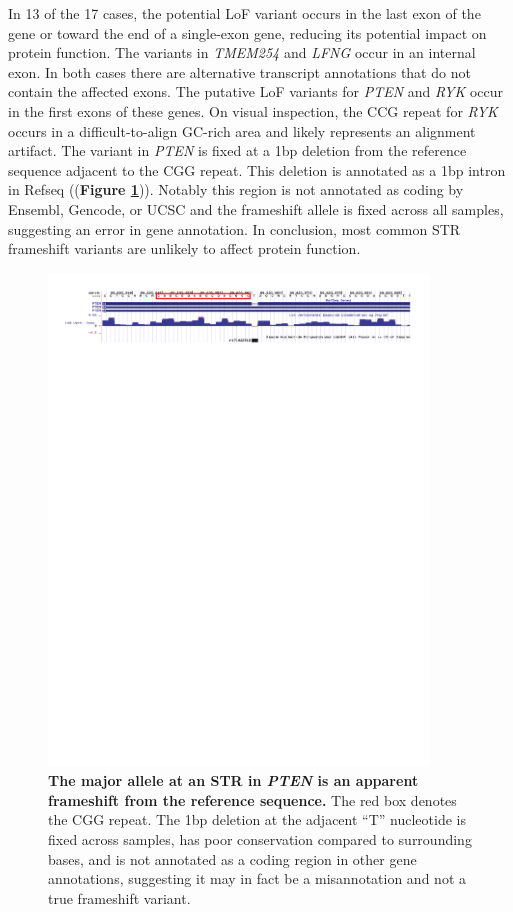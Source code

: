 In 13 of the 17 cases, the potential LoF variant occurs in the last exon of the gene or toward the end of a single-exon gene, reducing its potential impact on protein function. The variants in \emph{TMEM254} and \emph{LFNG} occur in an internal exon. In both cases there are alternative transcript annotations that do not contain the affected exons. The putative LoF variants for \emph{PTEN} and \emph{RYK} occur in the first exons of these genes. On visual inspection, the CCG repeat for \emph{RYK} occurs in a difficult-to-align GC-rich area and likely represents an alignment artifact. The variant in \emph{PTEN} is fixed at a 1bp deletion from the reference sequence adjacent to the CGG repeat. This deletion is annotated as a 1bp intron in Refseq ((\textbf{Figure \ref{fig:sgdpfig5}})). Notably this region is not annotated as coding by Ensembl, Gencode, or UCSC and the frameshift allele is fixed across all samples, suggesting an error in gene annotation. In conclusion, most common STR frameshift variants are unlikely to affect protein function.

\begin{figure}[h!]
\centering
\label{fig:sgdpfig5}
\includegraphics[width=0.9\textwidth]{Figures/App3/Fig5.pdf}
\caption{\textbf{The major allele at an STR in \emph{PTEN} is an apparent frameshift from the reference sequence.} The red box denotes the CGG repeat. The 1bp deletion at the adjacent ``T'' nucleotide is fixed across samples, has poor conservation compared to surrounding bases, and is not annotated as a coding region in other gene annotations, suggesting it may in fact be a misannotation and not a true frameshift variant.}
\end{figure}

